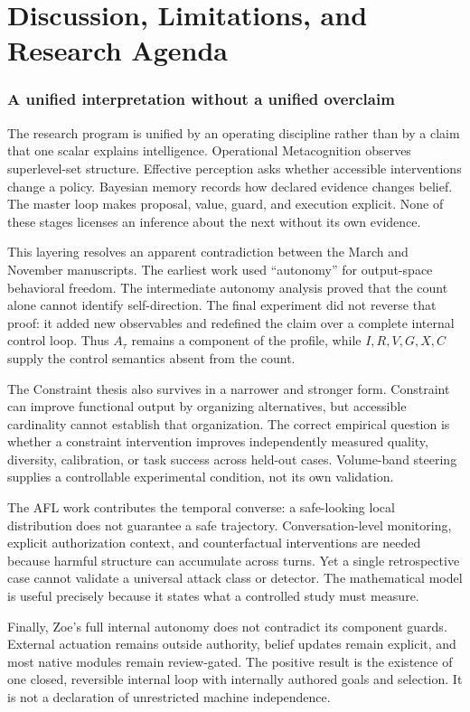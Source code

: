 \clearpage
\part{Discussion, Limitations, and Research Agenda}

\section{A unified interpretation without a unified overclaim}
The research program is unified by an operating discipline rather than by a claim that one scalar explains intelligence. Operational Metacognition observes superlevel-set structure. Effective perception asks whether accessible interventions change a policy. Bayesian memory records how declared evidence changes belief. The master loop makes proposal, value, guard, and execution explicit. None of these stages licenses an inference about the next without its own evidence.

This layering resolves an apparent contradiction between the March and November manuscripts. The earliest work used ``autonomy'' for output-space behavioral freedom. The intermediate autonomy analysis proved that the count alone cannot identify self-direction. The final experiment did not reverse that proof: it added new observables and redefined the claim over a complete internal control loop. Thus $A_\tau$ remains a component of the profile, while $I,R,V,G,X,C$ supply the control semantics absent from the count.

The Constraint thesis also survives in a narrower and stronger form. Constraint can improve functional output by organizing alternatives, but accessible cardinality cannot establish that organization. The correct empirical question is whether a constraint intervention improves independently measured quality, diversity, calibration, or task success across held-out cases. Volume-band steering supplies a controllable experimental condition, not its own validation.

The AFL work contributes the temporal converse: a safe-looking local distribution does not guarantee a safe trajectory. Conversation-level monitoring, explicit authorization context, and counterfactual interventions are needed because harmful structure can accumulate across turns. Yet a single retrospective case cannot validate a universal attack class or detector. The mathematical model is useful precisely because it states what a controlled study must measure.

Finally, Zoe's full internal autonomy does not contradict its component guards. External actuation remains outside authority, belief updates remain explicit, and most native modules remain review-gated. The positive result is the existence of one closed, reversible internal loop with internally authored goals and selection. It is not a declaration of unrestricted machine independence.

